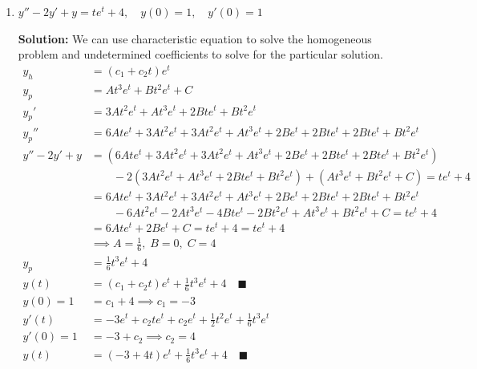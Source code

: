 \documentclass[letterpaper, fontsize=11pt]{scrartcl} %
\numberwithin{equation}{section} %
\numberwithin{figure}{section} %
\numberwithin{table}{section} %
\begin{document}
\begin{enumerate}
\begin{enumerate}
\item $y'' -2y' +y=te^t +4,\quad y(0) = 1,\quad y'(0) = 1$
\par \textbf{Solution:} We can use characteristic equation to solve the homogeneous problem and undetermined coefficients to solve for the particular solution. 
\begin{align*}
y_h &= (c_1 +c_2t)e^t\\
y_p &= At^3e^t + Bt^2e^t + C\\
y_p' &= 3At^2e^t + At^3e^t + 2Bte^t + Bt^2e^t\\
y_p'' &= 6Ate^t + 3At^2e^t + 3At^2e^t + At^3e^t + 2Be^t + 2Bte^t + 2Bte^t + Bt^2e^t\\
y'' -2y' +y&= (6Ate^t + 3At^2e^t + 3At^2e^t + At^3e^t + 2Be^t + 2Bte^t + 2Bte^t + Bt^2e^t) \\
&\qquad-2(3At^2e^t + At^3e^t + 2Bte^t + Bt^2e^t) +( At^3e^t + Bt^2e^t + C)=te^t +4\\
&= 6Ate^t + 3At^2e^t + 3At^2e^t + At^3e^t + 2Be^t + 2Bte^t + 2Bte^t + Bt^2e^t \\
&\qquad-6At^2e^t -2At^3e^t -4Bte^t -2Bt^2e^t + At^3e^t + Bt^2e^t + C=te^t +4\\
&= 6Ate^t + 2Be^t + C=te^t +4=te^t +4\\
&\implies A = \frac{1}{6},\; B= 0,\; C = 4\\
y_p &= \frac{1}{6}t^3e^t + 4\\
y(t) &= (c_1 +c_2t)e^t + \frac{1}{6}t^3e^t + 4\quad\blacksquare\\
y(0) = 1 &= c_1 + 4 \implies c_1 = -3\\
y'(t) &= -3e^t + c_2te^t + c_2e^t + \frac{1}{2}t^2e^t + \frac{1}{6}t^3e^t \\
y'(0) =1 &= -3 + c_2 \implies c_2 = 4\\
y(t) &= (-3 +4t)e^t + \frac{1}{6}t^3e^t + 4\quad\blacksquare
\end{align*}


\end{enumerate}
\end{enumerate}
\end{document}
